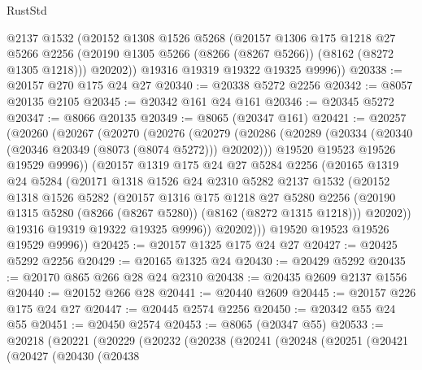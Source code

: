 \begin{lexlean}{RustStd}
\begin{coremodule}
        @2137
        @1532
        (@20152
          @1308
          @1526
          @5268
          (@20157
            @1306
            @175
            @1218
            @27
            @5266
            @2256
            (@20190 @1305 @5266 (@8266 (@8267 @5266)) (@8162 (@8272 @1305 @1218)))
            @20202))
        @19316
        @19319
        @19322
        @19325
        @9996))
@20338 := @20157 @270 @175 @24 @27
@20340 := @20338 @5272 @2256
@20342 := @8057 @20135 @2105
@20345 := @20342 @161 @24 @161
@20346 := @20345 @5272
@20347 := @8066 @20135
@20349 := @8065 (@20347 @161)
@20421 := @20257
    (@20260
      (@20267
        (@20270
          (@20276
            (@20279
              (@20286
                (@20289 (@20334 (@20340 (@20346 @20349 (@8073 (@8074 @5272))) @20202)))
                @19520
                @19523
                @19526
                @19529
                @9996))
            (@20157
              @1319
              @175
              @24
              @27
              @5284
              @2256
              (@20165
                @1319
                @24
                @5284
                (@20171
                  @1318
                  @1526
                  @24
                  @2310
                  @5282
                  @2137
                  @1532
                  (@20152
                    @1318
                    @1526
                    @5282
                    (@20157
                      @1316
                      @175
                      @1218
                      @27
                      @5280
                      @2256
                      (@20190 @1315 @5280 (@8266 (@8267 @5280)) (@8162 (@8272 @1315 @1218)))
                      @20202))
                  @19316
                  @19319
                  @19322
                  @19325
                  @9996))
              @20202)))
        @19520
        @19523
        @19526
        @19529
        @9996))
@20425 := @20157 @1325 @175 @24 @27
@20427 := @20425 @5292 @2256
@20429 := @20165 @1325 @24
@20430 := @20429 @5292
@20435 := @20170 @865 @266 @28 @24 @2310
@20438 := @20435 @2609 @2137 @1556
@20440 := @20152 @266 @28
@20441 := @20440 @2609
@20445 := @20157 @226 @175 @24 @27
@20447 := @20445 @2574 @2256
@20450 := @20342 @55 @24 @55
@20451 := @20450 @2574
@20453 := @8065 (@20347 @55)
@20533 := @20218
    (@20221
      (@20229
        (@20232
          (@20238
            (@20241
              (@20248
                (@20251
                  (@20421
                    (@20427
                      (@20430
                        (@20438

\end{coremodule}
\end{lexlean}
